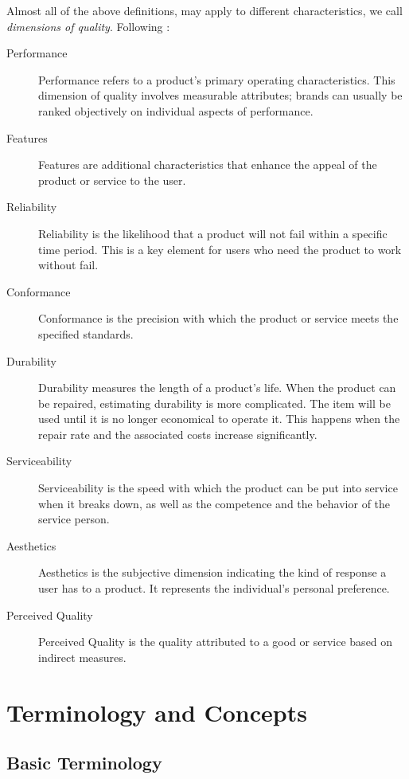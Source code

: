 Almost all of the above definitions, may apply to different characteristics, we call \emph{dimensions of quality}. Following \cite{wikipedia_eight_2015} :
\begin{description}
\item [Performance] Performance refers to a product's primary operating characteristics. This dimension of quality involves measurable attributes; brands can usually be ranked objectively on individual aspects of performance.
\item [{Features}] Features are additional characteristics that enhance the appeal of the product or service to the user.
\item [{Reliability}] Reliability is the likelihood that a product will not fail within a specific time period. This is a key element for users who need the product to work without fail.
\item [{Conformance}] Conformance is the precision with which the product or service meets the specified standards.
\item [{Durability}] Durability measures the length of a product’s life. When the product can be repaired, estimating durability is more complicated. The item will be used until it is no longer economical to operate it. This happens when the repair rate and the associated costs increase significantly.
\item [{Serviceability}] Serviceability is the speed with which the product can be put into service when it breaks down, as well as the competence and the behavior of the service person.
\item [{Aesthetics}] Aesthetics is the subjective dimension indicating the kind of response a user has to a product. It represents the individual’s personal preference.
\item [{Perceived Quality}] Perceived Quality is the quality attributed to a good or service based on indirect measures.
\end{description}


\section{Terminology and Concepts}

\subsection{Basic Terminology}

